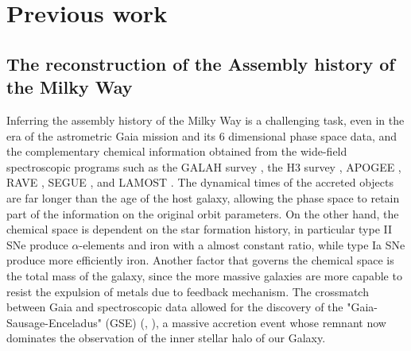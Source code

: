 \chapter{Previous work}

\section{The reconstruction of the Assembly history of the Milky Way}
Inferring the assembly history of the Milky Way is a challenging task, even in the era of the astrometric Gaia mission and its 6 dimensional 
phase space data, and the complementary chemical information obtained from the wide-field spectroscopic programs such as the GALAH survey
\cite{desilvaGALAHSurveyScientific2015}, the H3 survey \cite{conroyMappingStellarHalo2019}, APOGEE \cite{majewskiApachePointObservatory2017}, RAVE \cite{steinmetzRadialVelocityExperiment2006},  SEGUE \cite{yannySEGUESPECTROSCOPICSURVEY2009}, and 
LAMOST \cite{cuiLargeSkyArea2012}. The dynamical times of the accreted objects are far longer than the age of the host galaxy, allowing the 
phase space to retain part of the information on the original orbit parameters. On the other hand, the chemical space is dependent on the star formation history, in particular type II SNe produce $\alpha$-elements and iron with a almost constant ratio, while type Ia SNe produce more efficiently iron. Another factor that governs the chemical space is the total mass of the galaxy, since the more massive galaxies are more capable to resist the expulsion of metals due to feedback mechanism. The crossmatch between Gaia and spectroscopic data allowed for the discovery of the "Gaia-Sausage-Enceladus" (GSE) (\cite{belokurovCoformationDiscStellar2018}, \cite{helmiMergerThatLed2018}), a massive accretion event whose remnant now dominates the observation of the inner stellar halo of our Galaxy. 
